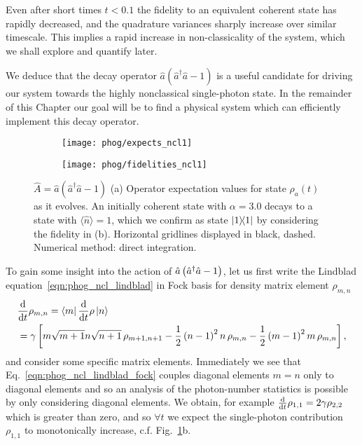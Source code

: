 Even after short times $t < 0.1$ the fidelity to an equivalent coherent state has rapidly decreased, and the quadrature variances sharply increase over similar timescale. This implies a rapid increase in non-classicality of the system, which we shall explore and quantify later.

We deduce that the decay operator $\hat{a}\left(\hat{a}^\dagger \hat{a} - 1\right)$ is a useful candidate for driving our system towards the highly nonclassical single-photon state. In the remainder of this Chapter our goal will be to find a physical system which can efficiently implement this decay operator.



\begin{figure}[htp]
\captionsetup{width=0.8\linewidth}
\centering
	\begin{subfigure}{0.7\linewidth}
	\centering
	\caption{}
	\texttt{[image: phog/expects\_ncl1]}
	\end{subfigure}
	\begin{subfigure}{0.7\linewidth}
	\centering
	\caption{}
	\texttt{[image: phog/fidelities\_ncl1]}
	\end{subfigure}
\caption{\label{fig:phog_A_ncl}$\hat{A} = \hat{a}\left(\hat{a}^\dagger \hat{a} - 1\right)$ (a) Operator expectation values for state $\rho_a\left(t\right)$ as it evolves. An initially coherent state with $\alpha=3.0$ decays to a state with $\langle \hat{n}\rangle=1$, which we confirm as state $\dyad{1}$ by considering the fidelity in (b). Horizontal gridlines displayed in black, dashed. Numerical method: direct integration.}
\end{figure}

To gain some insight into the action of $\hat{a}\left(\hat{a}^\dagger \hat{a} - 1\right)$, let us first write the Lindblad equation~\ref{eqn:phog_ncl_lindblad} in Fock basis for density matrix element $\rho_{m, n}$
\begin{align}\label{eqn:phog_ncl_lindblad_fock}
&\ddt \rho_{m, n} = \bra{m} \ddt \rho \ket{n} \notag  \\
%
&= \gamma \left[ m \sqrt{m+1} n \sqrt{n+1} \, \rho_{m+1, n+1} - \frac{1}{2} \left(n-1\right)^2 n\, \rho_{m, n} - \frac{1}{2} \left(m-1\right)^2 m\, \rho_{m, n}\right],
\end{align}
and consider some specific matrix elements. Immediately we see that Eq.~\ref{eqn:phog_ncl_lindblad_fock} couples diagonal elements $m=n$ only to diagonal elements and so an analysis of the photon-number statistics is possible by only considering diagonal elements. We obtain, for example $\frac{\mathrm{d}}{\mathrm{d}t} \rho_{1, 1}=2 \gamma \rho_{2, 2}$ which is greater than zero, and so $\forall t$ we expect the single-photon contribution $\rho_{1,1}$ to monotonically increase, c.f. Fig.~\ref{fig:phog_A_ncl}b. 

